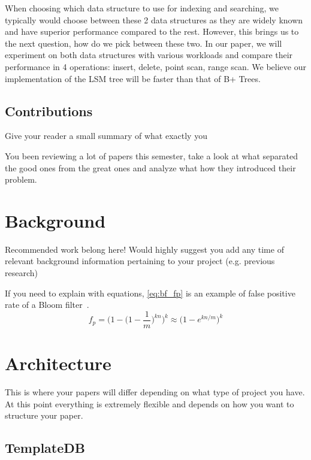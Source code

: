 \documentclass[sigconf]{acmart}
\begin{document}
When choosing which data structure to use for indexing and searching, we typically would choose between these 2 data structures as they are widely known and have superior performance compared to the rest. However, this brings us to the next question, how do we pick between these two. In our paper, we will experiment on both data structures with various workloads and compare their performance in 4 operations: insert, delete, point scan, range scan. We believe our implementation of the LSM tree will be faster than that of B+ Trees.

\subsection{Contributions}

Give your reader a small summary of what exactly you 

You been reviewing a lot of papers this semester, take a look at what separated
the good ones from the great ones and analyze what how they introduced their
problem.


\section{Background}
Recommended work belong here! Would highly suggest you add any time of relevant
background information pertaining to your project (e.g. previous research)

If you need to explain with equations, \ref{eq:bf_fp} is an example of false positive 
rate of a Bloom filter~\cite{Bloom}.
\begin{equation}
    f_p = \Big(1-\Big(1-\frac{1}{m}\Big)^{kn}\Big)^{k} \approx \Big(1-e^{kn/m} \Big)^{k}
    \label{eq:bf_fp}
 \end{equation}

\section{Architecture}
This is where your papers will differ depending on what type of project you
have. At this point everything is extremely flexible and depends on how you
want to structure your paper.

\subsection{TemplateDB}
\end{document}
